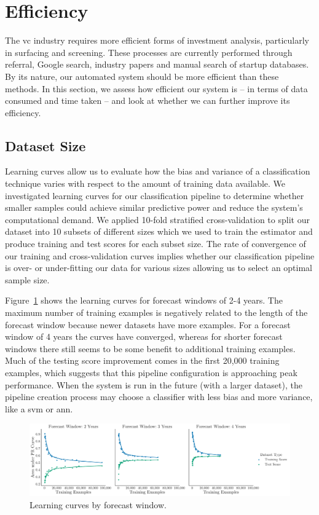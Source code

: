 \documentclass[../thesis/thesis.tex]{subfiles}
\begin{document}
\section{Efficiency}

The \gls{vc} industry requires more efficient forms of investment analysis, particularly in surfacing and screening. These processes are currently performed through referral, Google search, industry papers and manual search of startup databases. By its nature, our automated system should be more efficient than these methods. In this section, we assess how efficient our system is -- in terms of data consumed and time taken -- and look at whether we can further improve its efficiency.

\subsection{Dataset Size}

Learning curves allow us to evaluate how the bias and variance of a classification technique varies with respect to the amount of training data available. We investigated learning curves for our classification pipeline to determine whether smaller samples could achieve similar predictive power and reduce the system's computational demand. We applied 10-fold stratified cross-validation to split our dataset into 10 subsets of different sizes which we used to train the estimator and produce training and test scores for each subset size. The rate of convergence of our training and cross-validation curves implies whether our classification pipeline is over- or under-fitting our data for various sizes allowing us to select an optimal sample size.

Figure~\ref{fig:evaluation:learning_window} shows the learning curves for forecast windows of 2-4 years. The maximum number of training examples is negatively related to the length of the forecast window because newer datasets have more examples. For a forecast window of 4 years the curves have converged, whereas for shorter forecast windows there still seems to be some benefit to additional training examples. Much of the testing score improvement comes in the first 20,000 training examples, which suggests that this pipeline configuration is approaching peak performance. When the system is run in the future (with a larger dataset), the pipeline creation process may choose a classifier with less bias and more variance, like a \gls{svm} or \gls{ann}.

\begin{figure}[!htb]
    \centering
    \includegraphics[width=\textwidth]{../figures/evaluation/learning_curves_window}
    \caption[Learning curves by forecast window]{Learning curves by forecast window.}
    \label{fig:evaluation:learning_window}
\end{figure}
\end{document}
